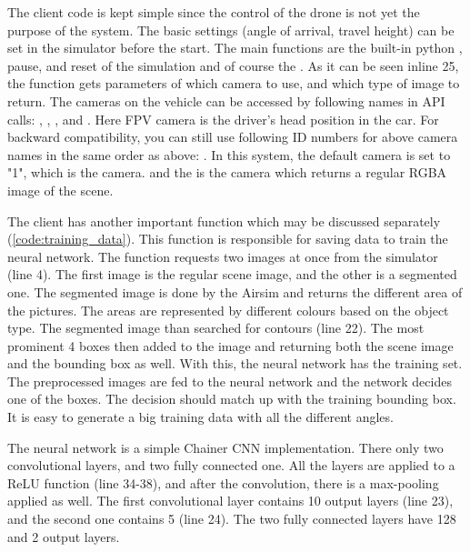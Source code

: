 The client code is kept simple since the control of the drone is not yet the purpose of the system.
The basic settings (angle of arrival, travel height) can be set in the simulator before the start.
The main functions are the built-in python , pause, and reset of the simulation and of course the .
As it can be seen inline 25, the function gets parameters of which camera to use, and which type of image to return.
The cameras on the vehicle can be accessed by following names in API calls: , , ,  and . Here FPV camera is the driver's head position in the car.
For backward compatibility, you can still use following ID numbers for above camera names in the same order as above: .
In this system, the default camera is set to "1", which is the  camera.
and the  is the  camera which returns a regular RGBA image of the scene.

The client has another important function which may be discussed separately (\cref{code:training_data}).
This function is responsible for saving data to train the neural network.
The function requests two images at once from the simulator (line 4).
The first image is the regular scene image, and the other is a segmented one.
The segmented image is done by the Airsim and returns the different area of the pictures.
The areas are represented by different colours based on the object type.
The segmented image than searched for contours (line 22).
The most prominent 4 boxes then added to the image and returning both the scene image and the bounding box as well.
With this, the neural network has the training set.
The preprocessed images are fed to the neural network and the network decides one of the boxes.
The decision should match up with the training bounding box.
It is easy to generate a big training data with all the different angles.

The neural network is a simple Chainer CNN implementation.
There only two convolutional layers, and two fully connected one.
All the layers are applied to a ReLU function (line 34-38), and after the convolution, there is a max-pooling applied as well.
The first convolutional layer contains 10 output layers (line 23), and the second one contains 5 (line 24).
The two fully connected layers have 128 and 2 output layers. 


